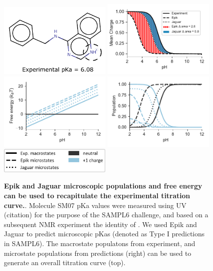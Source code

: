 \documentclass[9pt,lineno,final]{elife}
\begin{document}
\begin{figure}[H]
	\centering
	
	\includegraphics[width=0.49\textwidth]{SM07_state.pdf}
	\includegraphics[width=0.49\textwidth]{fig1_charge_sm07.pdf} \\
    \includegraphics[width=0.49\textwidth]{fig1_free_energy_sm07.pdf}
	\includegraphics[width=0.49\textwidth]{fig1_population_sm07.pdf}\\
	\includegraphics[width=0.49\textwidth]{fig1_legend}
	
		\caption{{\bf Epik and Jaguar microscopic populations and free energy can be used to recapitulate the experimental titration curve.}. Molecule SM07 pKa values were measured using UV (citation) for the purpose of the SAMPL6 challenge, and based on a subsequent NMR experiment the identity of . We used Epik and Jaguar to predict microscopic pKas (denoted as Type I predictions in SAMPL6). The macrostate populatons from experiment, and microstate populations from predictions (right) can be used to generate an overall titration curve (top). 
	\label{fig:jaguar-prediction}}
\end{figure}
\end{document}
